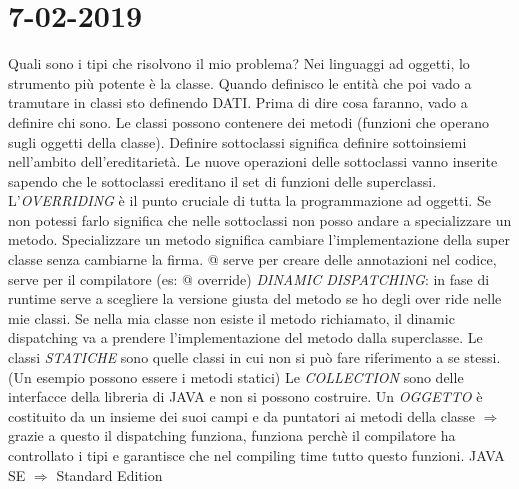 

\newpage
\section{7-02-2019}
\par
Quali sono i tipi che risolvono il mio problema? \newline
Nei linguaggi ad oggetti, lo strumento più potente è la classe. Quando definisco le entità
che poi vado a tramutare in classi sto definendo DATI. \newline
Prima di dire cosa faranno, vado a definire chi sono. \newline
Le classi possono contenere dei metodi (funzioni che operano sugli oggetti della classe). \newline
Definire sottoclassi significa definire sottoinsiemi nell'ambito dell'ereditarietà. Le nuove operazioni delle sottoclassi vanno inserite sapendo che le sottoclassi ereditano il set di funzioni delle superclassi. \newline
L'\textit{OVERRIDING} è il punto cruciale di tutta la programmazione ad oggetti. Se non potessi farlo significa che nelle sottoclassi non posso andare a specializzare un metodo. Specializzare un metodo significa cambiare l'implementazione della super classe senza cambiarne la firma. \newline
@ serve per creare delle annotazioni nel codice, serve per il compilatore (es: @ override)
\newline
\textit{DINAMIC DISPATCHING}: in fase di runtime serve a scegliere la versione giusta 
del metodo se ho degli over ride nelle mie classi. Se nella mia classe non esiste il metodo richiamato, il dinamic dispatching va a prendere l'implementazione del metodo dalla superclasse.
\newline
Le classi \textit{STATICHE} sono quelle classi in cui non si può fare riferimento a se stessi. (Un esempio possono essere i metodi statici) \newline
Le \textit{COLLECTION} sono delle interfacce della libreria di JAVA e non si possono costruire.
\newline
Un \textit{OGGETTO} è costituito da un insieme dei suoi campi e da puntatori ai metodi della classe $\Rightarrow$ grazie a questo il dispatching funziona, funziona perchè il compilatore ha controllato i tipi e garantisce che nel compiling time tutto questo funzioni. \newline
JAVA SE $\Rightarrow$ Standard Edition \newline
